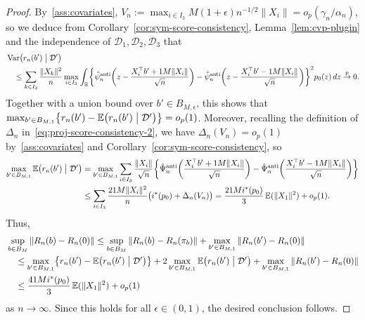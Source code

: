 \documentclass[a4paper]{article}
\newcommand{\R}{\mathbb{R}}
\newcommand{\E}{\mathbb{E}}
\newcommand{\norm}[1]{\|{#1}\|}
\newcommand{\cvp}{\overset{p}{\to}}
\DeclareMathOperator\Var{Var}
\theoremstyle{definition}
\begin{document}
\begin{proof}
By~\ref{ass:covariates}, $V_n := \max_{i \in I_3} M(1 + \epsilon)n^{-1/2}\norm{X_i} = o_p(\gamma_n/\alpha_n)$, so we deduce from Corollary~\ref{cor:sym-score-consistency}, Lemma~\ref{lem:cvp-plugin} and the independence of $\mathcal{D}_1,\mathcal{D}_2,\mathcal{D}_3$ that
\begin{align*}
&\Var\bigl(r_n(b') \bigm| \mathcal{D}'\bigr) \\
&\quad\leq \sum_{k \in I_3} \frac{\norm{X_k}^2}{n} \max_{i \in I_3} \int_\R\biggl\{\hat{\psi}_n^{\mathrm{anti}}\biggl(z - \frac{X_i^\top b' + \epsilon M\norm{X_i}}{\sqrt{n}}\biggr) - \hat{\psi}_n^{\mathrm{anti}}\biggl(z - \frac{X_i^\top b' - \epsilon M\norm{X_i}}{\sqrt{n}}\biggr)\biggr\}^2 p_0(z)\,dz \cvp 0.
\end{align*}
Together with a union bound over $b' \in B_{M,\epsilon}$, this shows that $\max_{b' \in B_{M,\epsilon}} \bigl\{r_n(b') - \E\bigl(r_n(b') \bigm| \mathcal{D}'\bigr)\bigr\} = o_p(1)$. Moreover, recalling the definition of $\Delta_n$ in~\eqref{eq:proj-score-consistency-2}, we have $\Delta_n(V_n) = o_p(1)$ by~\ref{ass:covariates} and Corollary~\ref{cor:sym-score-consistency}, so
\begin{align*}
\max_{b' \in B_{M,\epsilon}}\E\bigl(r_n(b') \bigm| \mathcal{D}'\bigr) &= \max_{b' \in B_{M,\epsilon}}\sum_{i \in I_3} \frac{\norm{X_i}}{\sqrt{n}} \biggl\{\hat{\Psi}_n^{\mathrm{anti}}\biggl(\frac{X_i^\top b' + \epsilon M\norm{X_i}}{\sqrt{n}}\biggr) - \hat{\Psi}_n^{\mathrm{anti}}\biggl(\frac{X_i^\top b' - \epsilon M\norm{X_i}}{\sqrt{n}}\biggr)\biggr\} \\
&\leq \sum_{i \in I_3} \frac{2\epsilon M\norm{X_i}^2}{n}\bigl(i^*(p_0) + \Delta_n(V_n)\bigr) = \frac{2\epsilon Mi^*(p_0)}{3}\,\E(\norm{X_1}^2) + o_p(1).
\end{align*}
Thus,
\begin{align*}
&\sup_{b \in B_M}\norm{R_n(b) - R_n(0)} \leq \sup_{b \in B_M}\|R_n(b) - R_n(\pi_b)\| + \max_{b' \in B_{M,\epsilon}}\norm{R_n(b') - R_n(0)} \\
&\quad\leq \max_{b' \in B_{M,\epsilon}} \bigl\{r_n(b') - \E\bigl(r_n(b') \bigm| \mathcal{D}'\bigr)\bigr\} + 2\max_{b' \in B_{M,\epsilon}}\E\bigl(r_n(b') \bigm| \mathcal{D}'\bigr) + \max_{b' \in B_{M,\epsilon}}\norm{R_n(b') - R_n(0)} \\
&\quad\leq \frac{4\epsilon Mi^*(p_0)}{3}\,\E(\norm{X_1}^2) + o_p(1)
\end{align*}
as $n \to \infty$. Since this holds for all $\epsilon \in (0,1)$, the desired conclusion follows.
\end{proof}
\end{document}
